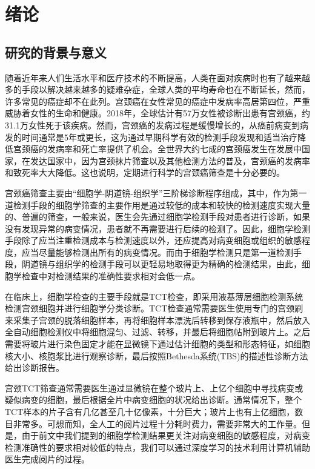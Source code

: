 \cleardoublepage

\section{绪论}

\subsection{研究的背景与意义}

\par 随着近年来人们生活水平和医疗技术的不断提高，人类在面对疾病时也有了越来越多的手段以解决越来越多的疑难杂症，全球人类的平均寿命也在不断延长，然而，许多常见的癌症却不在此列。宫颈癌在女性常见的癌症中发病率高居第四位，严重威胁着女性的生命和健康。2018年，全球估计有57万女性被诊断出患有宫颈癌，约31.1万女性死于该疾病。然而，宫颈癌的发病过程是缓慢增长的，从癌前病变到病发的时间通常是5年或更长，这为通过早期科学有效的检测手段发现和适当治疗降低宫颈癌的发病率和死亡率提供了机会。全世界大约七成的宫颈癌发生在发展中国家\cite{wild2014world}，在发达国家中，因为宫颈抹片筛查以及其他检测方法的普及，宫颈癌的发病率和致死率大大降低\cite{canavan2000cervical}。这也说明，定期进行科学的宫颈癌筛查是十分必要的。
\par 宫颈癌筛查主要由“细胞学-阴道镜-组织学”三阶梯诊断程序组成，其中，作为第一道检测手段的细胞学筛查的主要作用是通过较低的成本和较快的检测速度实现大量的、普遍的筛查，一般来说，医生会先通过细胞学检测手段对患者进行诊断，如果没有发现异常的病变情况，患者就不再需要进行后续的检测了。因此，细胞学检测手段除了应当注重检测成本与检测速度以外，还应提高对病变细胞或组织的敏感程度，应当尽量能够检测出所有的病变情况。而由于细胞学检测只是第一道检测手段，阴道镜与组织学的检测手段可以更轻易地取得更为精确的检测结果，由此，细胞学检查中对检测结果的准确性要求相对会低一点。
\par 在临床上，细胞学检查的主要手段就是TCT检查，即采用液基薄层细胞检测系统检测宫颈细胞并进行细胞学分类诊断。TCT检查通常需要医生使用专门的宫颈刷来采集子宫颈的脱落细胞样本，再将细胞样本漂洗后转移到保存液瓶中，然后放入全自动细胞检测仪中将细胞混匀、过滤、转移，并最后将细胞帖附到玻片上。之后需要将玻片进行染色固定才能在显微镜下通过估计细胞的类型和形态特征，如细胞核大小、核胞浆比进行观察诊断，最后按照Bethesda系统(TBS)的描述性诊断方法给出诊断报告。
\par 宫颈TCT筛查通常需要医生通过显微镜在整个玻片上、上亿个细胞中寻找病变或疑似病变的细胞，最后根据全片中病变细胞的状况给出诊断。通常情况下，整个TCT样本的片子含有几亿甚至几十亿像素，十分巨大；玻片上也有上亿细胞，数目非常多。可想而知，全人工的阅片过程十分耗时费力，需要非常大的工作量。但是，由于前文中我们提到的细胞学检测结果更关注对病变细胞的敏感程度，对病变检测准确性的要求相对较低的特点，我们可以通过深度学习的技术利用计算机辅助医生完成阅片的过程。
